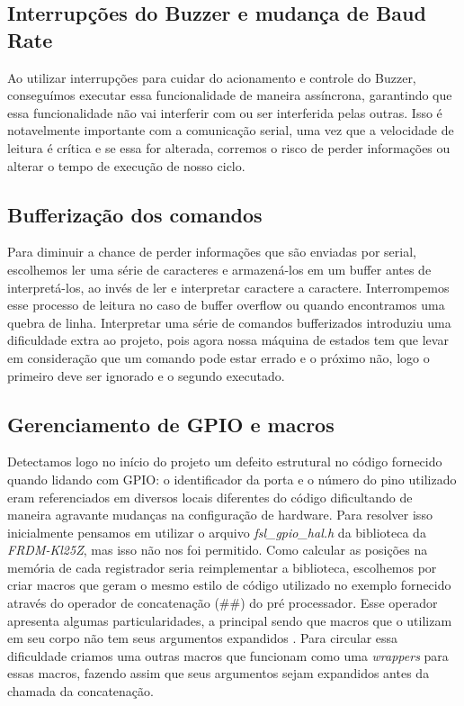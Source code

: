 \documentclass{article}
\begin{document}
\subsection{Interrupções do Buzzer e mudança de Baud Rate}
Ao utilizar interrupções para cuidar do acionamento e controle do Buzzer, conseguímos executar essa funcionalidade de maneira assíncrona, garantindo que essa funcionalidade não vai interferir com ou ser interferida pelas outras. Isso é notavelmente importante com a comunicação serial, uma vez que a velocidade de leitura é crítica e se essa for alterada, corremos o risco de perder informações ou alterar o tempo de execução de nosso ciclo.

\subsection{Bufferização dos comandos}
Para diminuir a chance de perder informações que são enviadas por serial, escolhemos ler uma série de caracteres e armazená-los em um buffer antes de interpretá-los, ao invés de ler e interpretar caractere a caractere. Interrompemos esse processo de leitura no caso de buffer overflow ou quando encontramos uma quebra de linha. Interpretar uma série de comandos bufferizados introduziu uma dificuldade extra ao projeto, pois agora nossa máquina de estados tem que levar em consideração que um comando pode estar errado e o próximo não, logo o primeiro deve ser ignorado e o segundo executado.

\subsection{Gerenciamento de GPIO e macros}
Detectamos logo no início do projeto um defeito estrutural no código fornecido quando lidando com GPIO: o identificador da porta e o número do pino utilizado eram referenciados em diversos locais diferentes do código dificultando de maneira agravante mudanças na configuração de hardware. Para resolver isso inicialmente pensamos em utilizar o arquivo \textit{fsl\_gpio\_hal.h} da biblioteca da \textit{FRDM-Kl25Z}, mas isso não nos foi permitido. Como calcular as posições na memória de cada registrador seria reimplementar a biblioteca, escolhemos por criar macros que geram o mesmo estilo de código utilizado no exemplo fornecido através do operador de concatenação (\#\#) do pré processador. Esse operador apresenta algumas particularidades, a principal sendo que macros que o utilizam em seu corpo não tem seus argumentos expandidos \cite{bb:preprocessor}. Para circular essa dificuldade criamos uma outras macros que funcionam como uma \textit{wrappers} para essas macros, fazendo assim que seus argumentos sejam expandidos antes da chamada da concatenação. 
\end{document}
